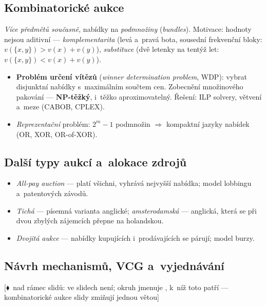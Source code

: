 \documentclass[11pt,a4paper]{article}
\theoremstyle{definition}
\newcommand{\mimoq}[1]{\textcolor{markcol}{\textsf{\footnotesize[$\blacklozenge$~nad rámec slidů: #1]}}}
\begin{document}
\subsection{Kombinatorické aukce}

\begin{defbox}
\emph{Více předmětů současně}, nabídky na \emph{podmnožiny} (\emph{bundles}). Motivace: hodnoty
nejsou aditivní --- \emph{komplementarita} (levá a~pravá bota, sousední frekvenční bloky:
$v(\{x,y\}) > v(x)+v(y)$), \emph{substituce} (dvě letenky na tentýž let:
$v(\{x,y\}) < v(x)+v(y)$).
\begin{itemize}
\item \textbf{Problém určení vítězů} (\emph{winner determination problem}, WDP): vybrat
  disjunktní nabídky s~maximálním součtem cen. Zobecnění množinového pakování ---
  \textbf{NP-těžký}, i~těžko aproximovatelný. Řešení: ILP solvery, větvení a~meze (CABOB, CPLEX).
\item \emph{Reprezentační} problém: $2^m - 1$ podmnožin $\Rightarrow$ kompaktní jazyky nabídek
  (OR, XOR, OR-of-XOR).
\end{itemize}
\end{defbox}
\subsection{Další typy aukcí a~alokace zdrojů}

\begin{itemize}
\item \emph{All-pay auction} --- platí všichni, vyhrává nejvyšší nabídka; model lobbingu
  a~patentových závodů.
\item \emph{Tichá} --- písemná varianta anglické; \emph{amsterodamská} --- anglická, která se
  při dvou zbylých zájemcích přepne na holandskou.
\item \emph{Dvojitá aukce} --- nabídky kupujících i~prodávajících se párují; model burzy.
\end{itemize}

\subsection{Návrh mechanismů, VCG a~vyjednávání}

\noindent\mimoq{ve slidech není; okruh jmenuje , k~níž toto patří ---
kombinatorické aukce slidy zmiňují jednou větou}
\end{document}
